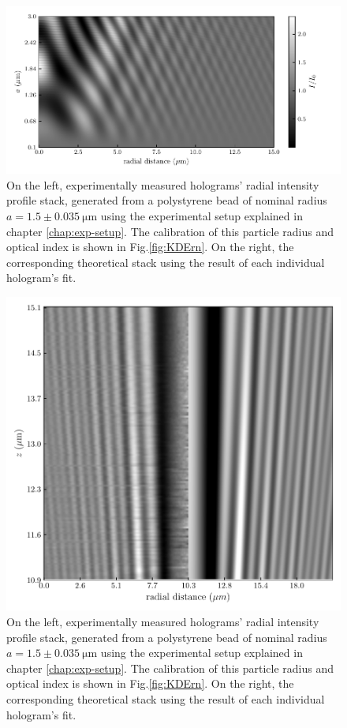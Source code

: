 \begin{figure}
	\centering
	\includegraphics{02_body/chapter2/images/holo_size_exemple/holos_only_r.pdf}
	\caption{On the left, experimentally measured  holograms' radial intensity profile stack, generated from a polystyrene bead of nominal radius $a = 1.5 \pm 0.035 ~ \mathrm{\mu m} $ using the experimental setup explained in chapter \ref{chap:exp-setup}. The calibration of this particle radius and optical index is shown in Fig.\ref{fig:KDErn}. On the right, the corresponding theoretical stack using the result of each individual hologram's fit.}
	\label{fig:holo_onlyr}
\end{figure}


\begin{figure}
	\centering
	\includegraphics{02_body/chapter2/images/test_tableau2.pdf}
	\caption{On the left, experimentally measured  holograms' radial intensity profile stack, generated from a polystyrene bead of nominal radius $a = 1.5 \pm 0.035 ~ \mathrm{\mu m} $ using the experimental setup explained in chapter \ref{chap:exp-setup}. The calibration of this particle radius and optical index is shown in Fig.\ref{fig:KDErn}. On the right, the corresponding theoretical stack using the result of each individual hologram's fit.}
	\label{fig:holo_z_fit}
\end{figure}



